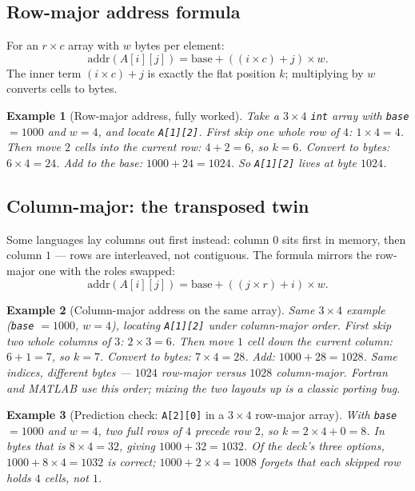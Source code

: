 \documentclass[11pt]{article}
\newtheorem{example}{Example}[section]
\begin{document}
\subsection{Row-major address formula}

For an $r \times c$ array with $w$ bytes per element:
\[ \text{addr}(A[i][j]) = \text{base} + ((i \times c) + j) \times w. \]
The inner term $(i \times c) + j$ is exactly the flat position $k$; multiplying by $w$ converts cells to bytes.

\begin{example}[Row-major address, fully worked]
Take a $3 \times 4$ \texttt{int} array with \texttt{base} $= 1000$ and $w = 4$, and locate \texttt{A[1][2]}. First skip one whole row of $4$: $1 \times 4 = 4$. Then move $2$ cells into the current row: $4 + 2 = 6$, so $k = 6$. Convert to bytes: $6 \times 4 = 24$. Add to the base: $1000 + 24 = 1024$. So \texttt{A[1][2]} lives at byte $1024$. 
\end{example}

\subsection{Column-major: the transposed twin}

Some languages lay columns out first instead: column $0$ sits first in memory, then column $1$ --- rows are interleaved, not contiguous. The formula mirrors the row-major one with the roles swapped:
\[ \text{addr}(A[i][j]) = \text{base} + ((j \times r) + i) \times w. \]

\begin{example}[Column-major address on the same array]
Same $3 \times 4$ example (\texttt{base} $= 1000$, $w = 4$), locating \texttt{A[1][2]} under column-major order. First skip two whole columns of $3$: $2 \times 3 = 6$. Then move $1$ cell down the current column: $6 + 1 = 7$, so $k = 7$. Convert to bytes: $7 \times 4 = 28$. Add: $1000 + 28 = 1028$. Same indices, different bytes --- $1024$ row-major versus $1028$ column-major. Fortran and MATLAB use this order; mixing the two layouts up is a classic porting bug. 
\end{example}

\begin{example}[Prediction check: \texttt{A[2][0]} in a $3 \times 4$ row-major array]
With \texttt{base} $= 1000$ and $w = 4$, two full rows of $4$ precede row $2$, so $k = 2 \times 4 + 0 = 8$. In bytes that is $8 \times 4 = 32$, giving $1000 + 32 = 1032$. Of the deck's three options, $1000 + 8 \times 4 = 1032$ is correct; $1000 + 2 \times 4 = 1008$ forgets that each skipped row holds $4$ cells, not $1$.
\end{example}
\end{document}
